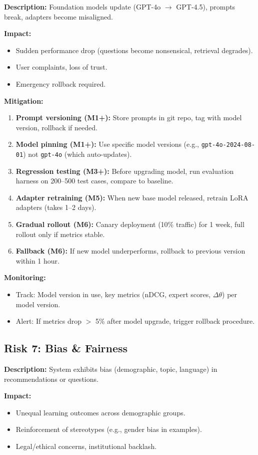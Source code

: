 \documentclass[11pt,letterpaper]{article}
\begin{document}
\textbf{Description:} Foundation models update (GPT-4o $\rightarrow$ GPT-4.5), prompts break, adapters become misaligned.

\textbf{Impact:}
\begin{itemize}
\item Sudden performance drop (questions become nonsensical, retrieval degrades).
\item User complaints, loss of trust.
\item Emergency rollback required.
\end{itemize}

\textbf{Mitigation:}
\begin{enumerate}
\item \textbf{Prompt versioning (M1+):} Store prompts in git repo, tag with model version, rollback if needed.
\item \textbf{Model pinning (M1+):} Use specific model versions (e.g., \texttt{gpt-4o-2024-08-01}) not \texttt{gpt-4o} (which auto-updates).
\item \textbf{Regression testing (M3+):} Before upgrading model, run evaluation harness on 200--500 test cases, compare to baseline.
\item \textbf{Adapter retraining (M5):} When new base model released, retrain LoRA adapters (takes 1--2 days).
\item \textbf{Gradual rollout (M6):} Canary deployment (10\% traffic) for 1 week, full rollout only if metrics stable.
\item \textbf{Fallback (M6):} If new model underperforms, rollback to previous version within 1 hour.
\end{enumerate}

\textbf{Monitoring:}
\begin{itemize}
\item Track: Model version in use, key metrics (nDCG, expert scores, $\Delta\theta$) per model version.
\item Alert: If metrics drop $>$ 5\% after model upgrade, trigger rollback procedure.
\end{itemize}

\subsection{Risk 7: Bias \& Fairness}

\textbf{Description:} System exhibits bias (demographic, topic, language) in recommendations or questions.

\textbf{Impact:}
\begin{itemize}
\item Unequal learning outcomes across demographic groups.
\item Reinforcement of stereotypes (e.g., gender bias in examples).
\item Legal/ethical concerns, institutional backlash.
\end{itemize}
\end{document}
